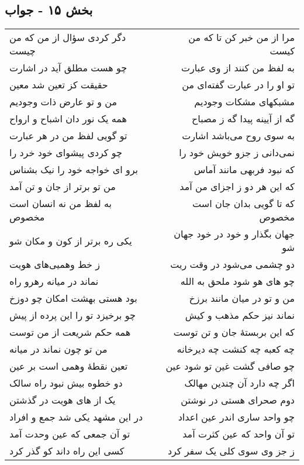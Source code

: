 \begin{center}
\section*{بخش ۱۵ - جواب}
\label{sec:sh015}
\begin{longtable}{l p{0.5cm} r}
دگر کردی سؤال از من که من چیست
&&
مرا از من خبر کن تا که من کیست
\\
چو هست مطلق آید در اشارت
&&
به لفظ من کنند از وی عبارت
\\
حقیقت کز تعین شد معین
&&
تو او را در عبارت گفته‌ای من
\\
من و تو عارض ذات وجودیم
&&
مشبکهای مشکات وجودیم
\\
همه یک نور دان اشباح و ارواح
&&
گه از آیینه پیدا گه ز مصباح
\\
تو گویی لفظ من در هر عبارت
&&
به سوی روح می‌باشد اشارت
\\
چو کردی پیشوای خود خرد را
&&
نمی‌دانی ز جزو خویش خود را
\\
برو ای خواجه خود را نیک بشناس
&&
که نبود فربهی مانند آماس
\\
من تو برتر از جان و تن آمد
&&
که این هر دو ز اجزای من آمد
\\
به لفظ من نه انسان است مخصوص
&&
که تا گویی بدان جان است مخصوص
\\
یکی ره برتر از کون و مکان شو
&&
جهان بگذار و خود در خود جهان شو
\\
ز خط وهمیی‌های هویت
&&
دو چشمی می‌شود در وقت ریت
\\
نماند در میانه رهرو راه
&&
چو های هو شود ملحق به الله
\\
بود هستی بهشت امکان چو دوزخ
&&
من و تو در میان مانند برزخ
\\
چو برخیزد تو را این پرده از پیش
&&
نماند نیز حکم مذهب و کیش
\\
همه حکم شریعت از من توست
&&
که این بربستهٔ جان و تن توست
\\
من تو چون نماند در میانه
&&
چه کعبه چه کنشت چه دیرخانه
\\
تعین نقطهٔ وهمی است بر عین
&&
چو صافی گشت غین تو شود عین
\\
دو خطوه بیش نبود راه سالک
&&
اگر چه دارد آن چندین مهالک
\\
یک از های هویت در گذشتن
&&
دوم صحرای هستی در نوشتن
\\
در این مشهد یکی شد جمع و افراد
&&
چو واحد ساری اندر عین اعداد
\\
تو آن جمعی که عین وحدت آمد
&&
تو آن واحد که عین کثرت آمد
\\
کسی این راه داند کو گذر کرد
&&
ز جز وی سوی کلی یک سفر کرد
\\
\end{longtable}
\end{center}
